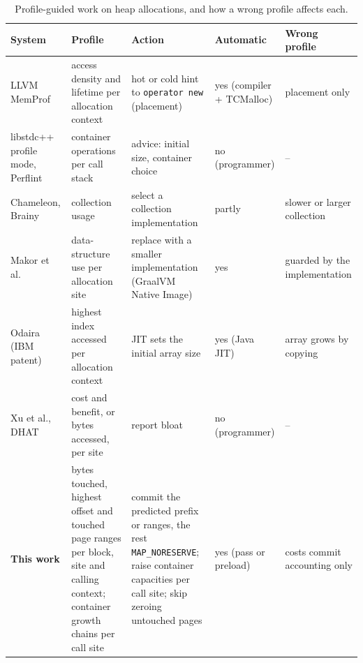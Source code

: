 \documentclass[11pt]{article}
\begin{document}
\begin{table}[t]
\centering\footnotesize
\begin{tabular}{L{2.9cm}L{3.1cm}L{3.7cm}L{2.2cm}L{2.4cm}}
\toprule
System & Profile & Action & Automatic & Wrong profile \\
\midrule
LLVM MemProf~\cite{MemProf} & access density and lifetime per allocation context & hot or cold hint to \texttt{operator new} (placement) & yes (compiler + TCMalloc) & placement only \\
libstdc++ profile mode, Perflint~\cite{Liu2009Perflint,LibstdcxxProfile} & container operations per call stack & advice: initial size, container choice & no (programmer) & -- \\
Chameleon, Brainy~\cite{Shacham2009Chameleon,Jung2011Brainy} & collection usage & select a collection implementation & partly & slower or larger collection \\
Makor et al.~\cite{Makor2025Replacement} & data-structure use per allocation site & replace with a smaller implementation (GraalVM Native Image) & yes & guarded by the implementation \\
Odaira (IBM patent)~\cite{Odaira2015ArraySize} & highest index accessed per allocation context & JIT sets the initial array size & yes (Java JIT) & array grows by copying \\
Xu et al., DHAT~\cite{Xu2010LowUtility,Xu2010Containers,ValgrindDHAT} & cost and benefit, or bytes accessed, per site & report bloat & no (programmer) & -- \\
\midrule
\textbf{This work} & bytes touched, highest offset and touched page ranges per block, site and calling context; container growth chains per call site & commit the predicted prefix or ranges, the rest \texttt{MAP\_NORESERVE}; raise container capacities per call site; skip zeroing untouched pages & yes (pass or preload) & costs commit accounting only \\
\bottomrule
\end{tabular}
\caption{Profile-guided work on heap allocations, and how a wrong profile affects each.}
\label{tab:related}
\end{table}
\end{document}

